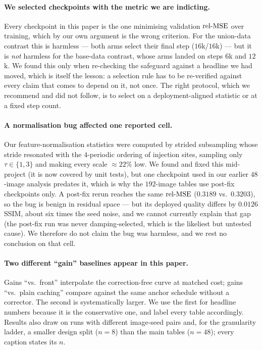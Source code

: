 \paragraph{We selected checkpoints with the metric we are indicting.} Every
checkpoint in this paper is the one minimising validation $\mathrm{rel\text{-}MSE}$ over training,
which by our own argument is the wrong criterion. For the union-data contrast this is
harmless --- both arms select their final step ($16$k/$16$k) --- but it is \emph{not}
harmless for the base-data contrast, whose arms landed on steps $6$k and $12$k. We
found this only when re-checking the safeguard against a headline we had moved, which
is itself the lesson: a selection rule has to be re-verified against every claim that
comes to depend on it, not once. The right protocol, which we recommend and did
not follow, is to select on a deployment-aligned statistic or at a fixed step count.

\paragraph{A normalisation bug affected one reported cell.} Our feature-normalisation
statistics were computed by strided subsampling whose stride resonated with the
$4$-periodic ordering of injection sites, sampling only $\tau\in\{1,3\}$ and making
every scale $\approx\!22\%$ low. We found and fixed this mid-project (it is now
covered by unit tests), but one checkpoint used in our earlier $48$-image analysis
predates it, which is why the $192$-image tables use post-fix checkpoints only. A post-fix rerun reaches the same $\mathrm{rel\text{-}MSE}$ ($0.3189$ vs.\ $0.3203$), so the bug is
benign in residual space --- but its deployed quality differs by $0.0126$ SSIM, about
six times the seed noise, and we cannot currently explain that gap (the post-fix run
was never damping-selected, which is the likeliest but untested cause). We therefore
do not claim the bug was harmless, and we rest no conclusion on that cell.

\paragraph{Two different ``gain'' baselines appear in this paper.} Gains ``vs.\ front''
interpolate the correction-free curve at matched cost; gains ``vs.\ plain caching''
compare against the same anchor schedule without a corrector. The second is
systematically larger. We use the first for headline numbers because it is the
conservative one, and label every table accordingly. Results also draw on runs with
different image-seed pairs and, for the granularity ladder, a smaller design split
($n{=}8$) than the main tables ($n{=}48$); every caption states its $n$.

